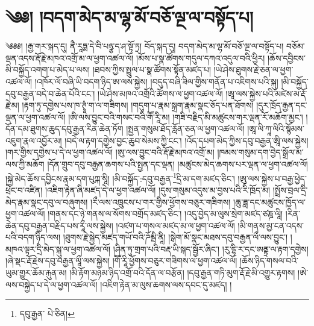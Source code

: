\setcounter{footnote}{0} 
\chapter{༄༅། །བདག་མེད་མ་ལྷ་མོ་བཅོ་ལྔ་ལ་བསྟོད་པ།}༄༅༅། །རྒྱ་གར་སྐད་དུ། ནཻ་རཱཏྨ་དེ་བི་པཉྩ་ད་ཤ་སྟོ་ཏྲ། བོད་སྐད་དུ། བདག་མེད་མ་ལྷ་མོ་བཅོ་ལྔ་ལ་བསྟོད་པ། བཅོམ་ལྡན་འདས་རྡོ་རྗེ་མཁའ་འགྲོ་མ་ལ་ཕྱག་འཚལ་ལོ། །མོས་པ་སྣ་ཚོགས་གདུལ་དཀའ་འདུལ་བའི་ཕྱིར། །ཆོས་དབྱིངས་མི་བསྐྱོད་འགག་པ་མེད་པ་ལས། །ཐབས་ཀྱིས་སྤྲུལ་པ་སྣ་ཚོགས་སྟོན་མཛད་པ། །ཡེ་ཤེས་ཐུགས་རྗེ་ཅན་ལ་ཕྱག་འཚལ་ལོ། །འཁོར་ལོ་བཞི་ཡི་བདག་ཉིད་ཨ་ལས་སྐྱེས། །བདུད་བཞི་ཟིལ་གྱིས་གནོན་པ་འཇིགས་པའི་སྐུ། །མི་བསྐྱོད་དབུ་བརྒྱན་བདེ་བ་ཆེན་པོའི་ངང་། །ཡེ་ཤེས་མཁའ་འགྲོའི་ཚོགས་ལ་ཕྱག་འཚལ་ལོ། །ཨཱ་ལས་སྐྱེས་པའི་མཛེས་མ་རྡོ་རྗེ་མ། །རྟག་ཏུ་དགྱེས་པས་ཁ་ཊྭཱཾ་ག་ལ་གཟིགས། །གདུག་པ་རྣམ་སྐྲག་རྣམ་སྣང་ཅོད་པན་ཐོགས། །དུར་ཁྲོད་རྒྱན་དང་ལྡན་ལ་ཕྱག་འཚལ་ལོ། །ཨི་ལས་བྱུང་བའི་གསང་བའི་གཽ་རཱི་མ། །གཟི་བརྗིད་མི་མཚུངས་གར་ལྡན་རོ་མཆོག་མྱང་། །དོན་དམ་ཐུགས་ཆུད་དབུ་རྒྱན་རིན་ཆེན་ཏོག །སྤྱན་གསུམ་ཐོད་རློན་ཅན་ལ་ཕྱག་འཚལ་ལོ། །ཨཱ་ལི་ཀཱ་ལིའི་སྙོམས་འཇུག་རྣལ་འབྱོར་མ། །བདེ་ལ་རྟག་དགྱེས་བྱང་ཆུབ་སེམས་ཀྱི་ངང་། །འོད་དཔག་མེད་ཀྱིས་དབུ་བརྒྱན་ཨཱི་ལས་སྐྱེས། །གར་གྱིས་དགྱེས་པ་དེ་ལ་ཕྱག་འཚལ་ལོ། །ཨུ་ལས་བྱུང་བའི་རྡོ་རྗེ་མཁའ་འགྲོ་མ། །ཁམས་གསུམ་དག་བྱེད་སྒྲོལ་མ་ལས་ཀྱི་མཆོག །དོན་གྲུབ་དབུ་བརྒྱན་ཆགས་པའི་སྤྱན་དང་ལྡན། །མཚུངས་མེད་ཆགས་པར་ལྡན་ལ་ཕྱག་འཚལ་ལོ། །སྐྱེ་མེད་ཆོས་དབྱིངས་རྣམ་དག་པུཀྐ་སཱི། །མི་བསྐྱོད་:དབུ་བརྒྱན་\footnote{དབུ་རྒྱན་  པེ་ཅིན། }དྲི་མ་དག་མཛད་ཅིང་། །ཨུ་ལས་སྐྱེས་པ་བརྒྱ་ཕྱེད་ཕྲེང་བ་འཛིན། །འཇིག་རྟེན་ཞི་མཛད་དེ་ལ་ཕྱག་འཚལ་ལོ། །དུས་གསུམ་འདུས་མ་བྱས་པའི་རི་ཁྲོད་མ། །སྤྲོས་བྲལ་དྲི་མེད་རྣམ་སྣང་དབུ་ལ་བཞུགས། །རྀ་ལས་འཁྲུངས་པ་གར་གྱིས་ཕྱོགས་བཅུར་གཟིགས། །ཆུ་ཟླ་དང་མཚུངས་ཁྱོད་ལ་ཕྱག་འཚལ་ལོ། །གནས་དང་ཉེ་གནས་ལ་སོགས་བགྲོད་མཛད་ཅིང་། །འདུ་བྱེད་མ་ལུས་སྲེག་མཛད་ཙཎྜ་ལཱི། །རིན་ཆེན་དབུ་བརྒྱན་བརྗིད་པས་རཱྀ་ལས་སྐྱེས། །འཛག་པ་གསལ་མཛད་མ་ལ་ཕྱག་འཚལ་ལོ། །མི་གནས་མྱ་ངན་འདས་པའི་བདག་ཉིད་ལས། །ཐུགས་རྗེ་སྐྱེད་མཛད་གཡོ་བའི་ཌོམྦི་ནཱི། །སྒེག་མོ་སྣང་མཐས་དབུ་བརྒྱན་ལྀ་ལས་བྱུང་། །མཁའ་ལྟར་དྲི་མེད་སྐུ་ལ་ཕྱག་འཚལ་ལོ། །ཤིན་ཏུ་གྲག་པའི་བརྡ་ཡི་སྐད་སྦྱོར་ཞིང་། །རུ་དྷི་ར་དང་ཨནྟྲ་ལ་རྟག་དགྱེས། །ཞེ་སྡང་རྡོ་རྗེས་དབུ་བརྒྱན་ལཱྀ་ལས་སྐྱེས། །གཽ་རཱི་ཕྱོགས་བཅུར་གཟིགས་ལ་ཕྱག་འཚལ་ལོ། །ཆོས་ཉིད་གསལ་བའི་ཡུམ་གྱུར་ཆོམ་རྐུན་མ། །མི་རྟོག་མཉམ་ཉིད་འགྲོ་བའི་དོན་ལ་བརྩོན། །དབུ་རྒྱན་གཏི་མུག་རྡོ་རྗེ་མི་འགྱུར་རྟགས། །ཨེ་ལས་བསྐྱེད་པ་དེ་ལ་ཕྱག་འཚལ་ལོ། །འཇིག་རྟེན་མ་ལུས་ཆགས་ལས་དབང་དུ་མཛད། །
